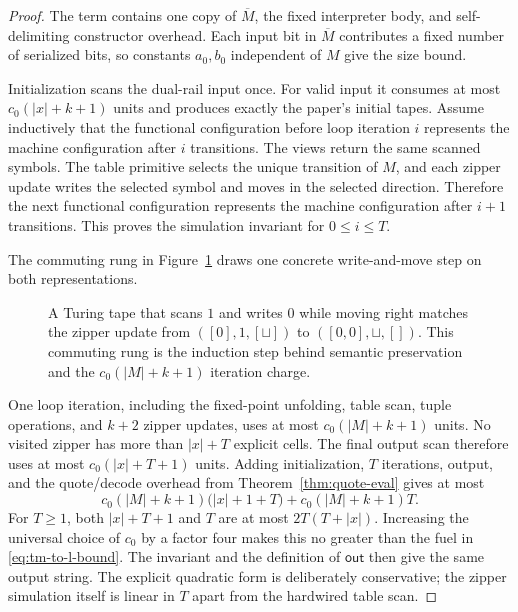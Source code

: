 \begin{proof}
The term contains one copy of \(\overline M\), the fixed interpreter body, and
self-delimiting constructor overhead.  Each input bit in \(\overline M\)
contributes a fixed number of serialized bits, so constants \(a_0,b_0\)
independent of \(M\) give the size bound.

Initialization scans the dual-rail input once.  For valid input it consumes at
most \(c_0(|x|+k+1)\) units and produces exactly the paper's initial tapes.
Assume inductively that the functional configuration before loop iteration
\(i\) represents the machine configuration after \(i\) transitions.  The
views return the same scanned symbols.  The table primitive selects the unique
transition of \(M\), and each zipper update writes the selected symbol and
moves in the selected direction.  Therefore the next functional configuration
represents the machine configuration after \(i+1\) transitions.  This proves
the simulation invariant for \(0\leq i\leq T\).

The commuting rung in Figure~\ref{fig:simulation-ladder} draws one concrete
write-and-move step on both representations.
\begin{figure}[t]
\centering

\caption{A Turing tape that scans \(1\) and writes \(0\) while moving right matches the zipper update from \(([0],1,[\sqcup])\) to \(([0,0],\sqcup,[])\).  This commuting rung is the induction step behind semantic preservation and the \(c_0(|M|+k+1)\) iteration charge.}
\label{fig:simulation-ladder}
\end{figure}

One loop iteration, including the fixed-point unfolding, table scan, tuple
operations, and \(k+2\) zipper updates, uses at most
\(c_0(|M|+k+1)\) units.  No visited zipper has more than \(|x|+T\) explicit
cells.  The final output scan therefore uses at most
\(c_0(|x|+T+1)\) units.  Adding initialization, \(T\) iterations, output, and
the quote/decode overhead from Theorem~\ref{thm:quote-eval} gives at most
\[
 c_0(|M|+k+1)\bigl(|x|+1+T\bigr)+
 c_0(|M|+k+1)T.
\]
For \(T\geq1\), both \(|x|+T+1\) and \(T\) are at most
\(2T(T+|x|)\).  Increasing the universal choice of \(c_0\) by a factor four
makes this no greater than the fuel in \eqref{eq:tm-to-l-bound}.  The invariant
and the definition of \(\mathsf{out}\) then give the same output string.  The
explicit quadratic form is deliberately conservative; the zipper simulation
itself is linear in \(T\) apart from the hardwired table scan.
\end{proof}

